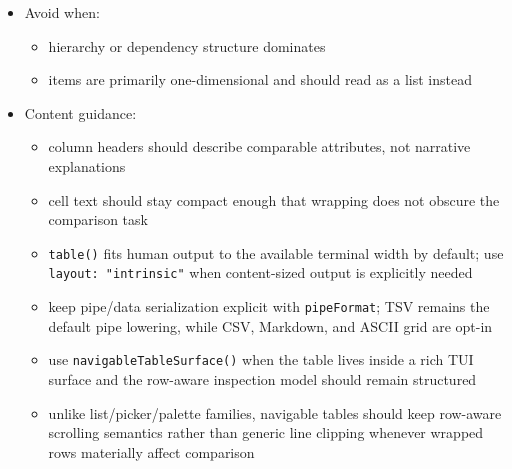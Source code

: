 \begin{itemize}
  \begin{itemize}
  \tightlist
  \item
    row/column comparison is the main task
  \end{itemize}
\item
  Avoid when:

  \begin{itemize}
  \tightlist
  \item
    hierarchy or dependency structure dominates
  \item
    items are primarily one-dimensional and should read as a list instead
  \end{itemize}
\item
  Content guidance:

  \begin{itemize}
  \tightlist
  \item
    column headers should describe comparable attributes, not narrative explanations
  \item
    cell text should stay compact enough that wrapping does not obscure the comparison task
  \item
    \texttt{t\allowbreak{}a\allowbreak{}b\allowbreak{}l\allowbreak{}e\allowbreak{}(\allowbreak{})} fits human output to the available terminal width by default; use \texttt{l\allowbreak{}a\allowbreak{}y\allowbreak{}o\allowbreak{}u\allowbreak{}t\allowbreak{}:\allowbreak{} \allowbreak{}"\allowbreak{}i\allowbreak{}n\allowbreak{}t\allowbreak{}r\allowbreak{}i\allowbreak{}n\allowbreak{}s\allowbreak{}i\allowbreak{}c\allowbreak{}"} when content-sized output is explicitly needed
  \item
    keep pipe/data serialization explicit with \texttt{p\allowbreak{}i\allowbreak{}p\allowbreak{}e\allowbreak{}F\allowbreak{}o\allowbreak{}r\allowbreak{}m\allowbreak{}a\allowbreak{}t}; TSV remains the default pipe lowering, while CSV, Markdown, and ASCII grid are opt-in
  \item
    use \texttt{n\allowbreak{}a\allowbreak{}v\allowbreak{}i\allowbreak{}g\allowbreak{}a\allowbreak{}b\allowbreak{}l\allowbreak{}e\allowbreak{}T\allowbreak{}a\allowbreak{}b\allowbreak{}l\allowbreak{}e\allowbreak{}S\allowbreak{}u\allowbreak{}r\allowbreak{}f\allowbreak{}a\allowbreak{}c\allowbreak{}e\allowbreak{}(\allowbreak{})} when the table lives inside a rich TUI surface and the row-aware inspection model should remain structured
  \item
    unlike list/picker/palette families, navigable tables should keep row-aware scrolling semantics rather than generic line clipping whenever wrapped rows materially affect comparison

\end{itemize}
\end{itemize}
